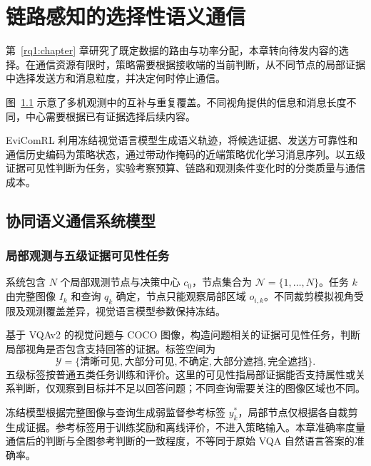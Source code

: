 \chapter{链路感知的选择性语义通信}
\label{rq2:chapter}

第~\ref{rq1:chapter} 章研究了既定数据的路由与功率分配，本章转向待发内容的选择。在通信资源有限时，策略需要根据接收端的当前判断，从不同节点的局部证据中选择发送方和消息粒度，并决定何时停止通信。

图~\ref{rq2:fig:observation} 示意了多机观测中的互补与重复覆盖。不同视角提供的信息和消息长度不同，中心需要根据已有证据选择后续内容。

\begin{figure}[htbp]
\centering

\label{rq2:fig:observation}
\end{figure}

EviComRL 利用冻结视觉语言模型生成语义轨迹，将候选证据、发送方可靠性和通信历史编码为策略状态，通过带动作掩码的近端策略优化学习消息序列。以五级证据可见性判断为任务，实验考察预算、链路和观测条件变化时的分类质量与通信成本。

\section{协同语义通信系统模型}
\label{rq2:sec:model}
\subsection{局部观测与五级证据可见性任务}
系统包含 $N$ 个局部观测节点与决策中心 $c_0$，节点集合为 $\mathcal N=\{1,\ldots,N\}$。任务 $k$ 由完整图像 $I_k$ 和查询 $q_k$ 确定，节点只能观察局部区域 $o_{i,k}$。不同裁剪模拟视角受限及观测覆盖差异，视觉语言模型参数保持冻结。

基于 VQAv2 的视觉问题与 COCO 图像\cite{vqa-v2,coco}，构造问题相关的证据可见性任务，判断局部视角是否包含支持回答的证据。标签空间为
\begin{equation}
\mathcal Y=\{\text{清晰可见},\text{大部分可见},\text{不确定},\text{大部分遮挡},\text{完全遮挡}\}.
\label{rq2:eq:labels}
\end{equation}
五级标签按普通五类任务训练和评价。这里的可见性指局部证据能否支持属性或关系判断，仅观察到目标并不足以回答问题；不同查询需要关注的图像区域也不同\cite{where-to-look-vqa,vqa-hat,gqa}。

冻结模型根据完整图像与查询生成弱监督参考标签 $y_k^*$，局部节点仅根据各自裁剪生成证据。参考标签用于训练奖励和离线评价，不进入策略输入。本章准确率度量通信后的判断与全图参考判断的一致程度，不等同于原始 VQA 自然语言答案的准确率。

